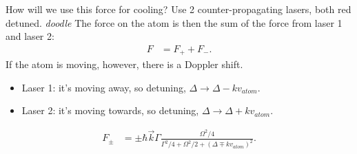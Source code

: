\documentclass[lasers.tex]{subfiles}
\begin{document}
How will we use this force for cooling?
Use 2 counter-propagating lasers, both red detuned. 
\emph{doodle}
The force on the atom is then the sum of the force from laser 1 and laser 2:
\begin{align}
    F &= F_+ + F_-.
\end{align}
If the atom is moving, however, there is a Doppler shift. 
\begin{itemize}
    \item Laser 1: it's moving away, so detuning, $\Delta\to\Delta-kv_{atom}$.
    \item Laser 2: it's moving towards, so detuning, $\Delta\to\Delta+kv_{atom}$.
\end{itemize}
\begin{align}
    F_{\pm} &= \pm \hbar\vec{k}\Gamma\frac{\Omega^2/4}{\Gamma^2/4 + \Omega^2/2 + (\Delta\mp kv_{atom})^2}.
\end{align}

\chapter{}

\chapter{}
\end{document}
